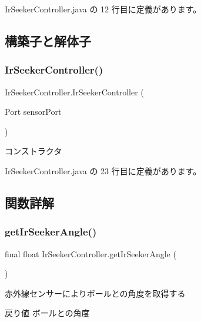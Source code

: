  Ir\+Seeker\+Controller.\+java の 12 行目に定義があります。



\subsection{構築子と解体子}
\mbox{\label{class_ir_seeker_controller_a5013fb830f68f74855f46d6748af1a71}} 
\subsubsection{\texorpdfstring{IrSeekerController()}{IrSeekerController()}}
{\footnotesize\ttfamily Ir\+Seeker\+Controller.\+Ir\+Seeker\+Controller (\begin{DoxyParamCaption}\item[{Port}]{sensor\+Port }\end{DoxyParamCaption})\hspace{0.3cm}{\ttfamily [inline]}}

コンストラクタ 

 Ir\+Seeker\+Controller.\+java の 23 行目に定義があります。



\subsection{関数詳解}
\mbox{\label{class_ir_seeker_controller_a71fb9a9096eebd286ef0f02c6f603468}} 
\subsubsection{\texorpdfstring{getIrSeekerAngle()}{getIrSeekerAngle()}}
{\footnotesize\ttfamily final float Ir\+Seeker\+Controller.\+get\+Ir\+Seeker\+Angle (\begin{DoxyParamCaption}{ }\end{DoxyParamCaption})\hspace{0.3cm}{\ttfamily [inline]}}

赤外線センサーによりボールとの角度を取得する \begin{DoxyReturn}{戻り値}
ボールとの角度 
\end{DoxyReturn}


